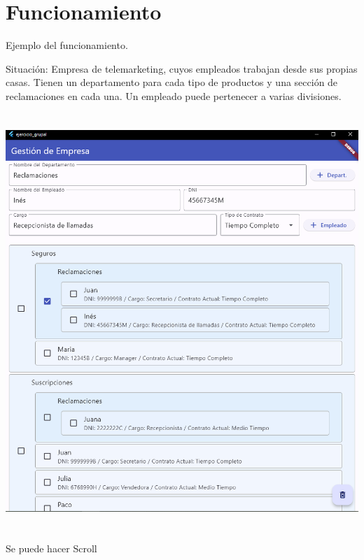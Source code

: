 \documentclass[
]{article}
\begin{document}
\section{\texorpdfstring{\hfill\break
}{ }}\label{section-1}

\section{Funcionamiento}\label{funcionamiento}

Ejemplo del funcionamiento.

Situación: Empresa de telemarketing, cuyos empleados trabajan desde sus
propias casas. Tienen un departamento para cada tipo de productos y una
sección de reclamaciones en cada una. Un empleado puede pertenecer a
varias divisiones.

\includegraphics[width=5.90625in,height=6.19543in]{imagenes/Funcionamiento1.png}

Se puede hacer Scroll
\end{document}
